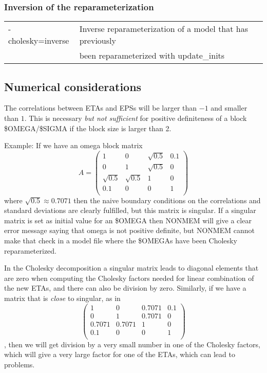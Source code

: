 \subsubsection*{Inversion of the reparameterization}
\begin{tabular}{ll}
    -cholesky=inverse &             Inverse reparameterization of a model that has previously\\
     &  been reparameterized with update\_inits\\
\end{tabular}

\subsection{Numerical considerations}
The correlations between ETAs and EPSs
will be larger than $-1$ and smaller than $1$. This is necessary \emph{but not sufficient}
for positive definiteness of a block \$OMEGA/\$SIGMA if the block size is larger than 2.

Example: If we have an omega block matrix
\[
A=
\left(
\begin{array}{cccc}
1          & 0          & \sqrt{0.5} & 0.1\\
0          & 1          & \sqrt{0.5} & 0\\
\sqrt{0.5} & \sqrt{0.5} & 1          & 0\\
0.1        & 0          & 0          & 1\\
\end{array}
\right)
\]
where $\sqrt{0.5}\approx 0.7071$
then the naive boundary conditions on the correlations and standard deviations are clearly fulfilled, but this
matrix is singular.
If a singular matrix is set as initial value for an \$OMEGA then NONMEM will
give a clear error message saying that omega is not positive definite, but NONMEM cannot make that check
in a model file where the \$OMEGAs have been Cholesky reparameterized.

In the Cholesky decomposition
a singular matrix leads to diagonal elements that are zero
when computing the Cholesky factors needed for linear combination of the new ETAs,
and there can also be division by zero.
Similarly, if we have a matrix that is \emph{close} to singular, as in
\[
\left(
\begin{array}{cccc}
1          & 0          & 0.7071     & 0.1\\
0          & 1          & 0.7071     & 0\\
0.7071     & 0.7071     & 1          & 0\\
0.1        & 0          & 0          & 1\\
\end{array}
\right)
\]
,
then we will get division by a very small number in one of the Cholesky factors,
which will give a very large factor for one of the ETAs, which can lead to problems.

